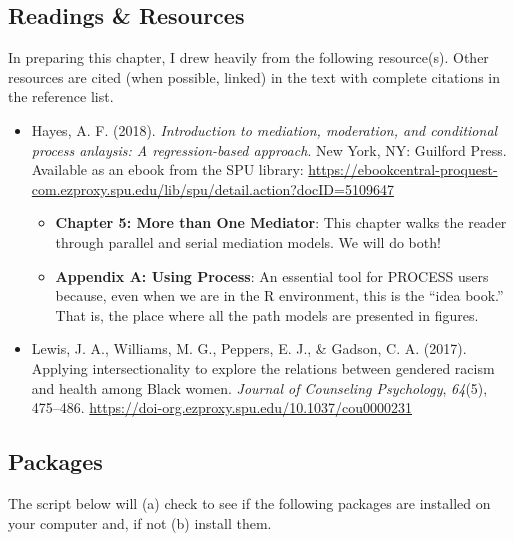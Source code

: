 \documentclass[
  english,
]{book}
\providecommand{\tightlist}{%
  \setlength{\itemsep}{0pt}\setlength{\parskip}{0pt}}
\begin{document}
\hypertarget{readings-resources-5}{%
\subsection{Readings \& Resources}\label{readings-resources-5}}

In preparing this chapter, I drew heavily from the following resource(s). Other resources are cited (when possible, linked) in the text with complete citations in the reference list.

\begin{itemize}
\tightlist
\item
  Hayes, A. F. (2018). \emph{Introduction to mediation, moderation, and conditional process anlaysis: A regression-based approach}. New York, NY: Guilford Press. Available as an ebook from the SPU library: \url{https://ebookcentral-proquest-com.ezproxy.spu.edu/lib/spu/detail.action?docID=5109647}

  \begin{itemize}
  \tightlist
  \item
    \textbf{Chapter 5: More than One Mediator}: This chapter walks the reader through parallel and serial mediation models. We will do both!
  \item
    \textbf{Appendix A: Using Process}: An essential tool for PROCESS users because, even when we are in the R environment, this is the ``idea book.'' That is, the place where all the path models are presented in figures.
  \end{itemize}
\item
  Lewis, J. A., Williams, M. G., Peppers, E. J., \& Gadson, C. A. (2017). Applying intersectionality to explore the relations between gendered racism and health among Black women. \emph{Journal of Counseling Psychology}, \emph{64}(5), 475--486. \url{https://doi-org.ezproxy.spu.edu/10.1037/cou0000231}
\end{itemize}

\hypertarget{packages-6}{%
\subsection{Packages}\label{packages-6}}

The script below will (a) check to see if the following packages are installed on your computer and, if not (b) install them.
\end{document}
